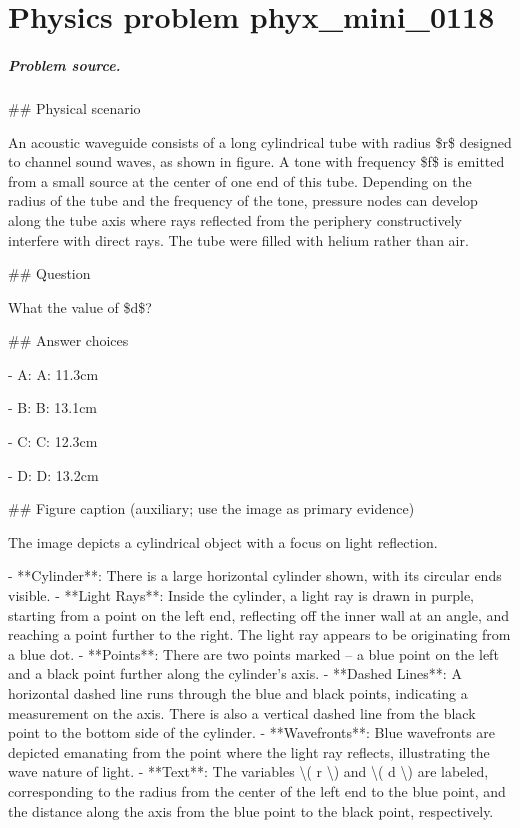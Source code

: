 
\chapter{Physics problem phyx\_mini\_0118}
\label{ch:PhyXMiniProblems_problem_phyx_mini_0118}

\paragraph{Problem source.}
\#\# Physical scenario

An acoustic waveguide consists of a long cylindrical tube with radius \$r\$ designed to channel sound waves, as shown in figure. A tone with frequency \$f\$ is emitted from a small source at the center of one end of this tube. Depending on the radius of the tube and the frequency of the tone, pressure nodes can develop along the tube axis where rays reflected from the periphery constructively interfere with direct rays. The tube were filled with helium rather than air.

\#\# Question

What the value of \$d\$?

\#\# Answer choices

- A: A: 11.3cm

- B: B: 13.1cm

- C: C: 12.3cm

- D: D: 13.2cm

\#\# Figure caption (auxiliary; use the image as primary evidence)

The image depicts a cylindrical object with a focus on light reflection. 

- **Cylinder**: There is a large horizontal cylinder shown, with its circular ends visible.
- **Light Rays**: Inside the cylinder, a light ray is drawn in purple, starting from a point on the left end, reflecting off the inner wall at an angle, and reaching a point further to the right. The light ray appears to be originating from a blue dot.
- **Points**: There are two points marked – a blue point on the left and a black point further along the cylinder's axis.
- **Dashed Lines**: A horizontal dashed line runs through the blue and black points, indicating a measurement on the axis. There is also a vertical dashed line from the black point to the bottom side of the cylinder.
- **Wavefronts**: Blue wavefronts are depicted emanating from the point where the light ray reflects, illustrating the wave nature of light.
- **Text**: The variables \textbackslash{}( r \textbackslash{}) and \textbackslash{}( d \textbackslash{}) are labeled, corresponding to the radius from the center of the left end to the blue point, and the distance along the axis from the blue point to the black point, respectively.

